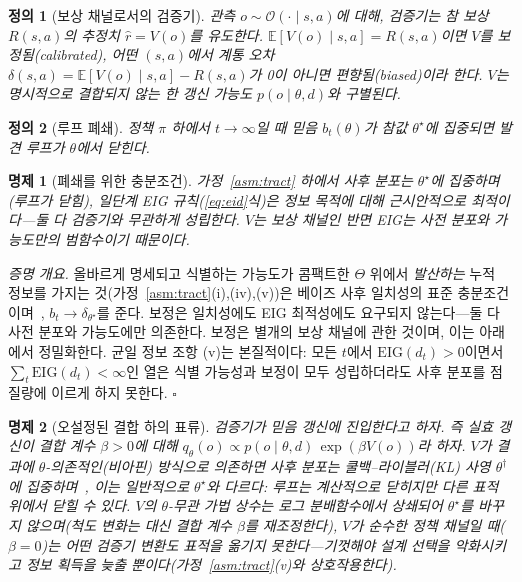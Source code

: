 \documentclass[11pt]{article}
\newtheorem{proposition}{명제}
\newtheorem{definition}{정의}
\begin{document}
\begin{definition}[보상 채널로서의 검증기]
\label{def:channel}
관측 $o \sim \mathcal{O}(\cdot \mid s,a)$에 대해, 검증기는 참 보상 $R(s,a)$의 추정치 $\hat{r} = V(o)$를 유도한다. $\mathbb{E}[V(o) \mid s,a] = R(s,a)$이면 $V$를 \emph{보정됨(calibrated)}, 어떤 $(s,a)$에서 계통 오차 $\delta(s,a) = \mathbb{E}[V(o) \mid s,a] - R(s,a)$가 0이 아니면 \emph{편향됨(biased)}이라 한다. $V$는 명시적으로 결합되지 않는 한 갱신 가능도 $p(o \mid \theta, d)$와 구별된다.
\end{definition}

\begin{definition}[루프 폐쇄]
\label{def:closure}
정책 $\pi$ 하에서 $t \to \infty$일 때 믿음 $b_t(\theta)$가 참값 $\theta^\star$에 집중되면 발견 루프가 $\theta$에서 \emph{닫힌다}.
\end{definition}

\begin{proposition}[폐쇄를 위한 충분조건]
\label{prop:suff}
가정~\ref{asm:tract} 하에서 사후 분포는 $\theta^\star$에 집중하며(루프가 닫힘), 일단계 EIG 규칙(\ref{eq:eid}식)은 정보 목적에 대해 근시안적으로 최적이다---둘 다 \emph{검증기와 무관하게} 성립한다. $V$는 보상 채널인 반면 EIG는 사전 분포와 가능도만의 범함수이기 때문이다.
\end{proposition}

\noindent\emph{증명 개요.} 올바르게 명세되고 식별하는 가능도가 콤팩트한 $\Theta$ 위에서 \emph{발산하는} 누적 정보를 가지는 것(가정~\ref{asm:tract}(i),(iv),(v))은 베이즈 사후 일치성의 표준 충분조건이며~\citep{ghosal2017fundamentals}, $b_t \to \delta_{\theta^\star}$를 준다. 보정은 일치성에도 EIG 최적성에도 요구되지 않는다---둘 다 사전 분포와 가능도에만 의존한다. 보정은 별개의 보상 채널에 관한 것이며, 이는 아래에서 정밀화한다. 균일 정보 조항 (v)는 본질적이다: 모든 $t$에서 $\mathrm{EIG}(d_t)>0$이면서 $\sum_t \mathrm{EIG}(d_t)<\infty$인 열은 식별 가능성과 보정이 모두 성립하더라도 사후 분포를 점질량에 이르게 하지 못한다. $\square$

\begin{proposition}[오설정된 결합 하의 표류]
\label{prop:drift}
검증기가 믿음 갱신에 진입한다고 하자. 즉 실효 갱신이 결합 계수 $\beta>0$에 대해 $q_\theta(o) \propto p(o \mid \theta, d)\,\exp(\beta V(o))$라 하자. $V$가 결과에 $\theta$-의존적인(비아핀) 방식으로 의존하면 사후 분포는 쿨백--라이블러(KL) 사영 $\theta^\dagger$에 집중하며~\citep{berk1966}, 이는 일반적으로 $\theta^\star$와 다르다: 루프는 계산적으로 닫히지만 다른 표적 위에서 닫힐 수 있다. $V$의 $\theta$-무관 가법 상수는 로그 분배함수에서 상쇄되어 $\theta^\star$를 바꾸지 않으며(척도 변화는 대신 결합 계수 $\beta$를 재조정한다), $V$가 순수한 정책 채널일 때($\beta=0$)는 어떤 검증기 변환도 표적을 옮기지 못한다---기껏해야 설계 선택을 악화시키고 정보 획득을 늦출 뿐이다(가정~\ref{asm:tract}(v)와 상호작용한다).
\end{proposition}
\end{document}
